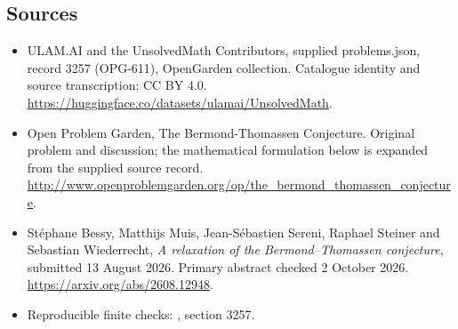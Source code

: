 \documentclass[11pt,a4paper]{article}
\begin{document}
\subsection{Sources}
\begin{itemize}
\item[S1] ULAM.AI and the UnsolvedMath Contributors, supplied problems.json, record 3257 (OPG-611), OpenGarden collection. Catalogue identity and source transcription; CC BY 4.0.
\url{https://huggingface.co/datasets/ulamai/UnsolvedMath}.
\item[S2] Open Problem Garden, The Bermond-Thomassen Conjecture. Original problem and discussion; the mathematical formulation below is expanded from the supplied source record.
\url{http://www.openproblemgarden.org/op/the_bermond_thomassen_conjecture}.

\item[R1] St\'ephane Bessy, Matthijs Muis, Jean-S\'ebastien Sereni,
Raphael Steiner and Sebastian Wiederrecht, \emph{A relaxation of the
Bermond--Thomassen conjecture}, submitted 13 August 2026. Primary
abstract checked 2 October 2026. \url{https://arxiv.org/abs/2608.12948}.
\item[R2] Reproducible finite checks:
, section 3257.

\end{itemize}
\end{document}
